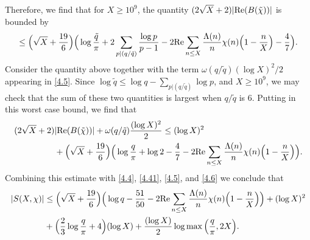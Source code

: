 \documentclass [12pt]{amsart}
\numberwithin{equation}{section}
\newcommand{\tRe}{\textup{Re}}
\begin{document}
 Therefore, we find that for $X\ge 10^9$, the quantity $(2\sqrt{X}+2) |\tRe(B(\tilde \chi))|$ is 
 bounded by 
 \begin{align*} 
 \le \Big(\sqrt{X}+\frac{19}{6} \Big) 
 \Big( \log \frac{\tilde q}{\pi} +2 \sum_{p|(q/\tilde q)} \frac{\log p}{p-1} -2\tRe \sum_{n\le X} 
 \frac{\Lambda(n)}{n}\chi(n) \Big(1-\frac{n}{X}\Big) -\frac 47\Big). 
 \end{align*}
 Consider the quantity above together with the term $\omega(q/{\tilde q})(\log X)^2/2$ 
 appearing in \eqref{4.5}.  Since $\log \tilde q \le \log q - \sum_{p|(q/\tilde q)} \log p$, and 
 $X\ge 10^{9}$, we may check that the sum of these two quantities is largest when 
 $q/{\tilde q}$ is $6$.   Putting in this worst case bound, we find that 
 \begin{align*}
 (2\sqrt{X}+2)&|\tRe (B(\tilde \chi))| + \omega(q/\tilde q)\frac{(\log X)^2}{2} 
 \le (\log X)^2 \\
 &+ \Big( \sqrt{X}+\frac{19}{6} \Big) \Big(\log \frac{q}{\pi} +\log 2 -\frac 47 -2\tRe 
 \sum_{n\le X} \frac{\Lambda(n)}{n} \chi(n)\Big(1-\frac nX\Big) \Big).
 \end{align*}
 Combining this estimate with \eqref{4.4}, \eqref{4.41}, \eqref{4.5}, and \eqref{4.6} we conclude 
 that 
 \begin{align}
 \label{4.8}
  |S(X,\chi)| &\le \Big(\sqrt{X}+\frac{19}{6}\Big) \Big(\log q-\frac{51}{50} -2\tRe\sum_{n\le X} 
 \frac{\Lambda(n)}{n}\chi(n) \Big(1-\frac nX\Big) \Big) +(\log X)^2
\nonumber \\
 &+ \Big(\frac 23 \log \frac { q}\pi + 4\Big) (\log X) +  \frac{(\log X)}{2} \log \max\Big(\frac{q}{\pi},2X\Big).
  \end{align}
  
 
 
  
  
\end{document}
